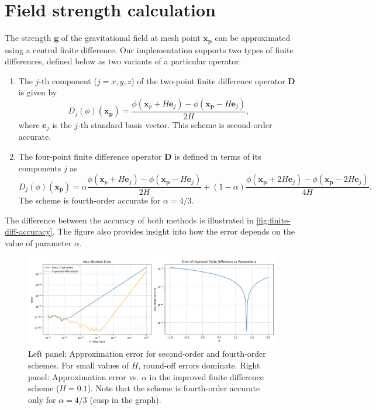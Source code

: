 \section{Field strength calculation}
The strength $\mathbf{g}$ of the gravitational field at mesh point $\mathbf{x}_\mathbf{p}$ can be approximated using a central finite difference.
Our implementation supports two types of finite differences, defined below as two variants of a particular operator.
\begin{enumerate}
    \item The $j$-th component ($j = x, y, z$) of the two-point finite difference operator $\mathbf{D}$ is given by
          \begin{equation}\label{eq:two-point-central-diff-def-1}
              D_j(\phi)(\mathbf{x}_\mathbf{p}) = \frac{\phi(\mathbf{x}_{p} + H\mathbf{e}_j) - \phi(\mathbf{x}_\mathbf{p} - H\mathbf{e}_j)}{2H},
          \end{equation}
          where $\mathbf{e}_j$ is the $j$-th standard basis vector.
          This scheme is second-order accurate.
    \item The four-point finite difference operator $\mathbf{D}$ is defined in terms of its components $j$ as
          \begin{equation*}
              D_j(\phi)(\mathbf{x}_\mathbf{p}) = \alpha\frac{\phi(\mathbf{x}_{p} + H\mathbf{e}_j) - \phi(\mathbf{x}_\mathbf{p} - H\mathbf{e}_j)}{2H} + (1-\alpha)\frac{\phi(\mathbf{x}_\mathbf{p} + 2H\mathbf{e}_j) - \phi(\mathbf{x}_\mathbf{p} - 2H\mathbf{e}_j)}{4H}.
          \end{equation*}
          The scheme is fourth-order accurate for $\alpha = 4/3$.
\end{enumerate}

The difference between the accuracy of both methods is illustrated in \autoref{fig:finite-diff-accuracy}.
The figure also provides insight into how the error depends on the value of parameter $\alpha$.
\begin{figure}[htp]
    \centering
    \includegraphics[scale=0.43]{chapters/pm-method/img/finite-difference.png}
    \caption{Left panel: Approximation error for second-order and fourth-order schemes.
        For small values of $H$, round-off errors dominate.
        Right panel: Approximation error vs. $\alpha$ in the improved finite difference scheme ($H = 0.1$).
        Note that the scheme is fourth-order accurate only for $\alpha = 4/3$ (cusp in the graph).}
    \label{fig:finite-diff-accuracy}
\end{figure}

